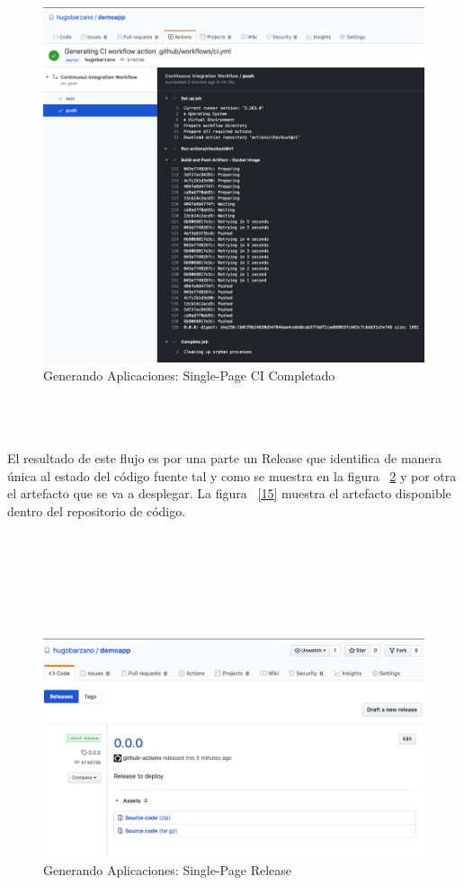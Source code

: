 \documentclass[a4paper,11pt]{book}
\begin{document}
\begin{figure}[H]
\centering
\includegraphics[scale=0.45]{imagenes/casouso_a/13.png}
\caption{ Generando Aplicaciones: Single-Page CI Completado  }
\label{13}
\end{figure}
~\\
~\\
~\\
El resultado de este flujo es por una parte un Release que identifica de manera única al estado del código fuente tal y como se muestra en la figura ~\ref{14} y por otra el artefacto que se va a desplegar. La figura ~\ref{15} muestra el artefacto disponible dentro del repositorio de código.  
~\\
~\\
~\\
~\\
~\\
~\\
~\\
\begin{figure}[H]
\centering
\includegraphics[scale=0.35]{imagenes/casouso_a/14.png}
\caption{ Generando Aplicaciones: Single-Page Release  }
\label{14}
\end{figure}
~\\
\end{document}
